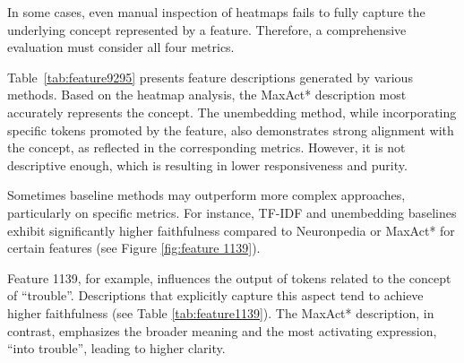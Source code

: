 In some cases, even manual inspection of heatmaps fails to fully capture the underlying concept represented by a feature. Therefore, a comprehensive evaluation must consider all four metrics. 

Table~\ref{tab:feature9295} presents feature descriptions generated by various methods. Based on the heatmap analysis, the MaxAct* description most accurately represents the concept. The unembedding method, while incorporating specific tokens promoted by the feature, also demonstrates strong alignment with the concept, as reflected in the corresponding metrics. However, it is not descriptive enough, which is resulting in lower responsiveness and purity.

Sometimes baseline methods may outperform more complex approaches, particularly on specific metrics. For instance, TF-IDF and unembedding baselines exhibit significantly higher faithfulness compared to Neuronpedia or MaxAct* for certain features (see Figure \ref{fig:feature 1139}).

Feature 1139, for example, influences the output of tokens related to the concept of ``trouble''. Descriptions that explicitly capture this aspect tend to achieve higher faithfulness (see Table \ref{tab:feature1139}). The MaxAct* description, in contrast, emphasizes the broader meaning and the most activating expression, ``into trouble'', leading to higher clarity.